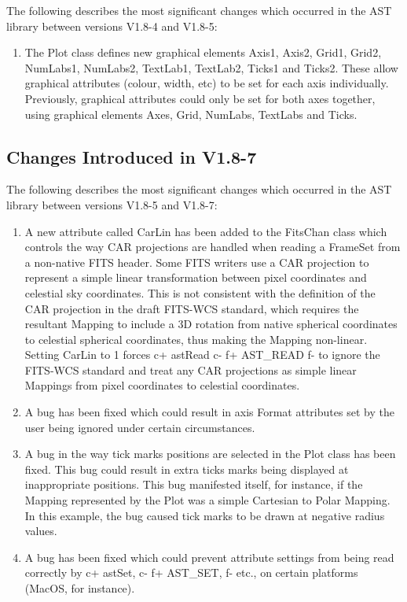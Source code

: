 \documentclass[twoside,11pt]{article}
\begin{document}
The following describes the most significant changes which
occurred in the AST library between versions V1.8-4 and V1.8-5:

\begin{enumerate}

\item The Plot class defines new graphical elements Axis1, Axis2,
Grid1, Grid2, NumLabs1, NumLabs2, TextLab1, TextLab2, Ticks1 and Ticks2.
These allow graphical attributes (colour, width, etc) to be set for each
axis individually. Previously, graphical attributes could only be set for
both axes together, using graphical elements Axes, Grid, NumLabs,
TextLabs and Ticks.

\end{enumerate}


\subsection{Changes Introduced in V1.8-7}

The following describes the most significant changes which
occurred in the AST library between versions V1.8-5 and V1.8-7:

\begin{enumerate}

\item A new attribute called CarLin has been added to the FitsChan class
which controls the way CAR projections are handled when reading a
FrameSet from a non-native FITS header. Some FITS writers use a CAR
projection to represent a simple linear transformation between pixel
coordinates and celestial sky coordinates. This is not consistent with
the definition of the CAR projection in the draft FITS-WCS standard, which
requires the resultant Mapping to include a 3D rotation from native
spherical coordinates to celestial spherical coordinates, thus making the
Mapping non-linear. Setting CarLin to 1 forces
c+
astRead
c-
f+
AST\_READ
f-
to ignore the FITS-WCS standard and treat any CAR projections as simple
linear Mappings from pixel coordinates to celestial coordinates.

\item A bug has been fixed which could result in axis Format attributes
set by the user being ignored under certain circumstances.

\item A bug in the way tick marks positions are selected in the Plot class
has been fixed. This bug could result in extra ticks marks being displayed at
inappropriate positions. This bug manifested itself, for instance, if the
Mapping represented by the Plot was a simple Cartesian to Polar Mapping.
In this example, the bug caused tick marks to be drawn at negative radius
values.

\item A bug has been fixed which could prevent attribute settings from
being read correctly by
c+
astSet,
c-
f+
AST\_SET,
f-
etc., on certain platforms (MacOS, for instance).

\end{enumerate}
\end{document}
